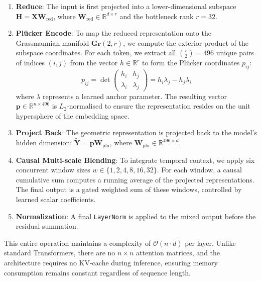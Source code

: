 \documentclass[conference]{IEEEtran}
\begin{document}
\begin{enumerate}[leftmargin=*,topsep=4pt,itemsep=6pt]
    \item \textbf{Reduce}: The input is first projected into a lower-dimensional subspace $\mathbf{H} = \mathbf{X} \mathbf{W}_{\text{red}}$, where $\mathbf{W}_{\text{red}} \in \mathbb{R}^{d \times r}$ and the bottleneck rank $r = 32$.

    \item \textbf{Pl\"ucker Encode}: To map the reduced representation onto the Grassmannian manifold $\mathbf{Gr}(2, r)$, we compute the exterior product of the subspace coordinates. For each token, we extract all $\binom{r}{2} = 496$ unique pairs of indices $(i, j)$ from the vector $h \in \mathbb{R}^r$ to form the Pl\"ucker coordinates $p_{ij}$:
    \begin{equation}
        p_{ij} = \det \begin{pmatrix} h_i & h_j \\ \lambda_i & \lambda_j \end{pmatrix} = h_i \lambda_j - h_j \lambda_i
    \end{equation}
    where $\lambda$ represents a learned anchor parameter. The resulting vector $\mathbf{p} \in \mathbb{R}^{n \times 496}$ is $L_2$-normalised to ensure the representation resides on the unit hypersphere of the embedding space.

    \item \textbf{Project Back}: The geometric representation is projected back to the model's hidden dimension: $\tilde{\mathbf{Y}} = \mathbf{p}\mathbf{W}_{\text{plu}}$, where $\mathbf{W}_{\text{plu}} \in \mathbb{R}^{496 \times d}$.

    \item \textbf{Causal Multi-scale Blending}: To integrate temporal context, we apply six concurrent window sizes $w \in \{1, 2, 4, 8, 16, 32\}$. For each window, a causal cumulative sum computes a running average of the projected representations. The final output is a gated weighted sum of these windows, controlled by learned scalar coefficients.

    \item \textbf{Normalization}: A final \texttt{LayerNorm} is applied to the mixed output before the residual summation.
\end{enumerate}

This entire operation maintains a complexity of $\mathcal{O}(n \cdot d)$ per layer. Unlike standard Transformers, there are no $n \times n$ attention matrices, and the architecture requires no KV-cache during inference, ensuring memory consumption remains constant regardless of sequence length.
\end{document}
